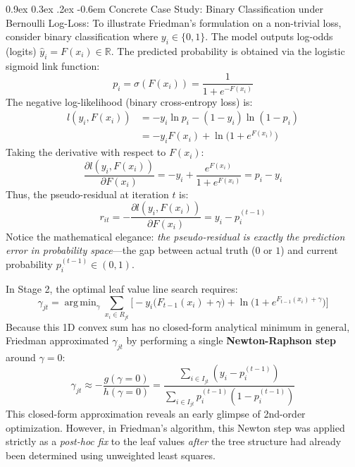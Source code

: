 \documentclass[11pt,a4paper]{article}
\makeatletter
\renewcommand\paragraph{\@startsection{paragraph}{4}{\z@}%
                                     {0.9ex \@plus0.3ex \@minus.2ex}%
                                     {-0.6em}%
                                     {\normalfont\normalsize\bfseries}}
\newcommand{\R}{\mathbb{R}}
\DeclareMathOperator*{\argmin}{arg\,min}
\makeatother
\begin{document}
\paragraph{Concrete Case Study: Binary Classification under Bernoulli Log-Loss:}
To illustrate Friedman's formulation on a non-trivial loss, consider binary classification where $y_i \in \{0, 1\}$. The model outputs log-odds (logits) $\hat{y}_i = F(x_i) \in \R$. The predicted probability is obtained via the logistic sigmoid link function:
\begin{equation}
    p_i = \sigma(F(x_i)) = \frac{1}{1 + e^{-F(x_i)}}
\end{equation}
The negative log-likelihood (binary cross-entropy loss) is:
\begin{align}
    l(y_i, F(x_i)) &= -y_i \ln p_i - (1 - y_i) \ln(1 - p_i) \nonumber \\
    &= -y_i F(x_i) + \ln\big(1 + e^{F(x_i)}\big)
\end{align}
Taking the derivative with respect to $F(x_i)$:
\begin{equation}
    \frac{\partial l(y_i, F(x_i))}{\partial F(x_i)} = -y_i + \frac{e^{F(x_i)}}{1 + e^{F(x_i)}} = p_i - y_i
\end{equation}
Thus, the pseudo-residual at iteration $t$ is:
\begin{equation}
    r_{it} = -\frac{\partial l(y_i, F(x_i))}{\partial F(x_i)} = y_i - p_i^{(t-1)}
\end{equation}
Notice the mathematical elegance: \emph{the pseudo-residual is exactly the prediction error in probability space}---the gap between actual truth ($0$ or $1$) and current probability $p_i^{(t-1)} \in (0, 1)$.

In Stage 2, the optimal leaf value line search requires:
\begin{equation}
    \gamma_{jt} = \argmin_\gamma \sum_{x_i \in R_{jt}} \Big[ -y_i \big(F_{t-1}(x_i) + \gamma\big) + \ln\big(1 + e^{F_{t-1}(x_i) + \gamma}\big) \Big]
\end{equation}
Because this 1D convex sum has no closed-form analytical minimum in general, Friedman approximated $\gamma_{jt}$ by performing a single \textbf{Newton-Raphson step} around $\gamma = 0$:
\begin{equation}
    \gamma_{jt} \approx -\frac{g(\gamma = 0)}{h(\gamma = 0)} = \frac{\sum_{i \in I_{jt}} (y_i - p_i^{(t-1)})}{\sum_{i \in I_{jt}} p_i^{(t-1)}(1 - p_i^{(t-1)})}
\end{equation}
This closed-form approximation reveals an early glimpse of 2nd-order optimization. However, in Friedman's algorithm, this Newton step was applied strictly as a \emph{post-hoc fix} to the leaf values \emph{after} the tree structure had already been determined using unweighted least squares.
\end{document}
